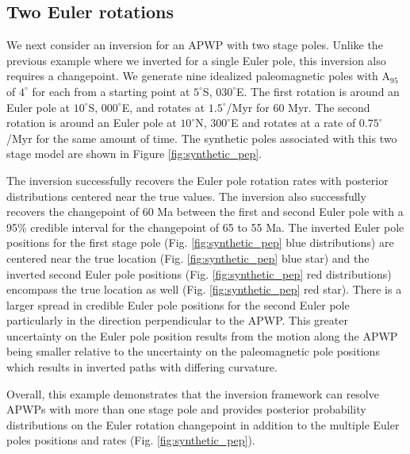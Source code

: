 \documentclass[11pt,letterpaper]{article}
\begin{document}
\subsection*{Two Euler rotations}
\label{sec:two_stage_poles}
We next consider an inversion for an APWP with two stage poles. Unlike the previous example where we inverted for a single Euler pole, this inversion also requires a changepoint. We generate nine idealized paleomagnetic poles with A$_{95}$ of $4^\circ$ for each from a starting point at $5^\circ$S, $030^\circ$E. The first rotation is around an Euler pole at $10^\circ$S, $000^\circ$E, and rotates at $1.5^\circ$/Myr for 60 Myr. The second rotation is around an Euler pole at $10^\circ$N, $300^\circ$E and rotates at a rate of $0.75^\circ$/Myr for the same amount of time. The synthetic poles associated with this two stage model are shown in Figure \ref{fig:synthetic_pep}. 

The inversion successfully recovers the Euler pole rotation rates with posterior distributions centered near the true values. The inversion also successfully recovers the changepoint of 60 Ma between the first and second Euler pole with a 95$\%$ credible interval for the changepoint of 65 to 55 Ma.  The inverted Euler pole positions for the first stage pole (Fig. \ref{fig:synthetic_pep} blue distributions) are centered near the true location (Fig. \ref{fig:synthetic_pep} blue star) and the inverted second Euler pole positions (Fig. \ref{fig:synthetic_pep} red distributions) encompass the true location as well (Fig. \ref{fig:synthetic_pep} red star). There is a larger spread in credible Euler pole positions for the second Euler pole particularly in the direction perpendicular to the APWP. This greater uncertainty on the Euler pole position results from the motion along the APWP being smaller relative to the uncertainty on the paleomagnetic pole positions which results in inverted paths with differing curvature.  

Overall, this example demonstrates that the inversion framework can resolve APWPs with more than one stage pole and provides posterior probability distributions on the Euler rotation changepoint in addition to the multiple Euler poles positions and rates (Fig. \ref{fig:synthetic_pep}).
\end{document}

